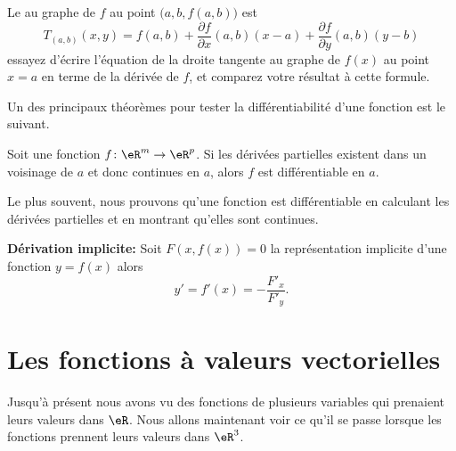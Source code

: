Le  au graphe de $f$ au point $\big(a,b,f(a,b)\big)$ est 
\begin{equation}
	T_{(a,b)}(x,y) = f(a,b) + \frac{\partial f}{\partial x}(a,b) (x-a) + \frac{\partial f}{\partial y}(a,b) (y-b)
\end{equation}
essayez d'écrire l'équation de la droite tangente au graphe de $f(x)$ au point $x=a$ en terme de la dérivée de $f$, et comparez votre résultat à cette formule.

Un des principaux théorèmes pour tester la différentiabilité d'une fonction est le suivant.

\begin{theorem}		\label{ThoProuverDiffable}
	Soit une fonction $f\colon \eR^m\to \eR^p$. Si les dérivées partielles existent dans un voisinage de $a$ et donc continues en $a$, alors $f$ est différentiable en $a$.
\end{theorem}
Le plus souvent, nous prouvons qu'une fonction est différentiable en calculant les dérivées partielles et en montrant qu'elles sont continues.

\textbf{Dérivation implicite:} Soit $F(x,f(x)) = 0$ la représentation implicite d'une fonction $y=f(x)$ alors \[y' = f'(x) = - \frac{F'_x}{F'_y}.\]


\section{Les fonctions à valeurs vectorielles}

Jusqu'à présent nous avons vu des fonctions de plusieurs variables qui prenaient leurs valeurs dans $\eR$. Nous allons maintenant voir ce qu'il se passe lorsque les fonctions prennent leurs valeurs dans $\eR^3$.

